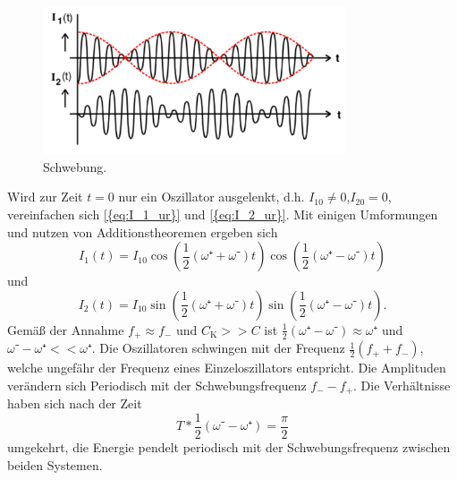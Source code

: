 \begin{figure}[h]
	\centering
	\label{fig:schwebung}
		\includegraphics[width=0.8\textwidth]{Bilder/Schwebung.pdf}
		\caption{Schwebung.}
\end{figure}

Wird zur Zeit $t=0$ nur ein Oszillator ausgelenkt, d.h. $I_{10}\neq0$,$I_{20}=0$, vereinfachen sich \eqref{{eq:I_1_ur}} und \eqref{{eq:I_2_ur}}. 
Mit einigen Umformungen und nutzen von Additionstheoremen ergeben sich
\begin{equation}
	I_1(t)=I_{10}\cos(\frac{1}{2}(\omega⁺+\omega⁻)t)\cos(\frac{1}{2}(\omega⁺-\omega⁻)t)
\end{equation}
und
\begin{equation}
	I_2(t)=I_{10}\sin(\frac{1}{2}(\omega⁺+\omega⁻)t)\sin(\frac{1}{2}(\omega⁺-\omega⁻)t).
\end{equation}
Gemäß der Annahme $f_+\approx f_-$ und $C_\mathup{K}>>C$ ist $\frac{1}{2}(\omega⁺-\omega⁻)\approx\omega⁺$ und $\omega⁻-\omega⁺<<\omega⁺$.
Die Oszillatoren schwingen mit der Frequenz $\frac{1}{2}(f_+ + f_-)$, welche ungefähr der Frequenz eines Einzeloszillators entspricht. 
Die Amplituden verändern sich Periodisch mit der Schwebungsfrequenz $f_- - f_+$. 
Die Verhältnisse haben sich nach der Zeit 
\begin{equation}
T*\frac{1}{2}({\omega⁻-\omega⁺})=\frac{\pi}{2}
\end{equation}
 umgekehrt, die Energie pendelt periodisch mit der Schwebungsfrequenz zwischen beiden Systemen.

\newpage

